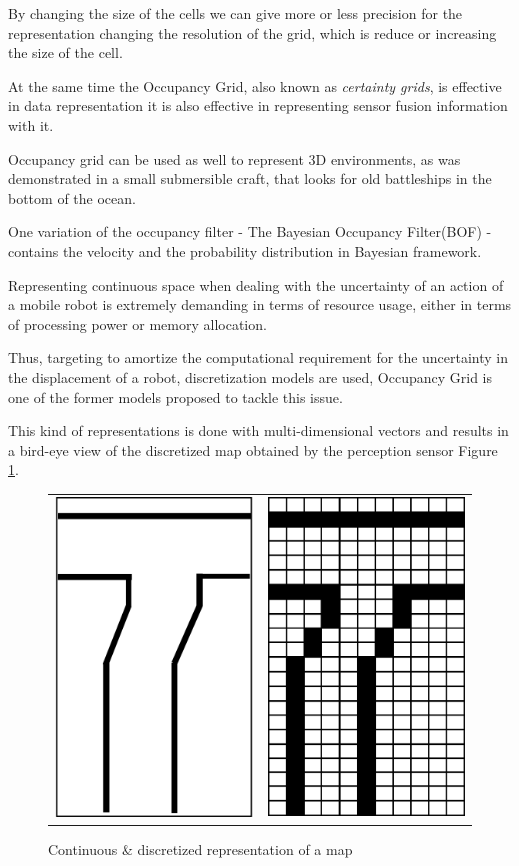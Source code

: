 By changing the size of the cells we can give more or less precision for the representation changing the resolution of the grid, which is reduce or increasing the size of the cell.

At the same time the Occupancy Grid, also known as \textit{certainty grids}, is effective in data representation it is also effective in representing sensor fusion information with it. 

Occupancy grid can be used as well to represent 3D environments, as was demonstrated in a small submersible craft, that looks for old battleships in the bottom of the ocean\cite{DBLP:journals/aim/Moravec88}.

One variation of the occupancy filter - The Bayesian Occupancy Filter(BOF) - contains the velocity and the probability distribution in Bayesian framework.

Representing continuous space when dealing with the uncertainty of an action of a mobile robot is extremely demanding in terms of resource usage, either in terms of processing power or memory allocation.

Thus, targeting to amortize the computational requirement for the uncertainty in the displacement of a robot, discretization models are used, Occupancy Grid\cite{Elfes:1989:UOG:68491.68495} is one of the former models proposed to tackle this issue.

This kind of representations is done with multi-dimensional vectors and results in a bird-eye view of the discretized map obtained by the perception sensor Figure \ref{fig:grid:continuous:discretized}.

\begin{figure}[h]
\centering
	\begin{tabular}{lr}\\
		\includegraphics[width=0.25\columnwidth]{img/fig:grid:continuous} &
		\includegraphics[width=0.25\columnwidth]{img/fig:grid:discretized}
	\end{tabular}
	\caption{Continuous \& discretized representation of a map}
	\label{fig:grid:continuous:discretized}
\end{figure}

